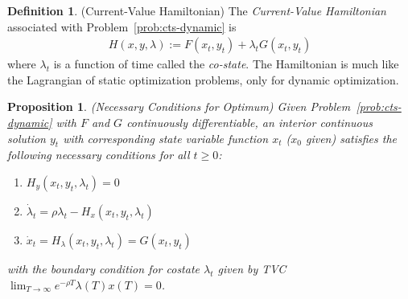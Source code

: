 \documentclass[12pt]{article}
\numberwithin{equation}{section} %
\theoremstyle{plain}
\newtheorem{prop}[thm]{Proposition}
\theoremstyle{definition}
\newtheorem{defn}[thm]{Definition}
\theoremstyle{remark}
\newcommand{\limT}{\lim_{T\rightarrow\infty}}
\begin{document}
\begin{defn}{(Current-Value Hamiltonian)}
The \emph{Current-Value Hamiltonian} associated with
Problem~\ref{prob:cts-dynamic} is
\begin{align*}
  H(x,y,\lambda) := F(x_t,y_t) + \lambda_t G(x_t,y_t)
\end{align*}
where $\lambda_t$ is a function of time called the \emph{co-state}.
The Hamiltonian is much like the Lagrangian of static optimization
problems, only for dynamic optimization.
\end{defn}

\begin{prop}\emph{(Necessary Conditions for Optimum)}
Given Problem~\ref{prob:cts-dynamic} with $F$ and $G$ continuously
differentiable, an interior continuous solution $y_t$ with corresponding
state variable function $x_t$ ($x_0$ given) satisfies the following
necessary conditions for all $t\geq 0$:
\begin{enumerate}
  \item $H_y (x_t,y_t,\lambda_t) = 0$
  \item $\dot{\lambda}_t = \rho\lambda_t- H_x(x_t, y_t, \lambda_t)$
  \item $\dot{x}_t = H_\lambda(x_t,y_t,\lambda_t) = G(x_t, y_t)$
\end{enumerate}
with the boundary condition for costate $\lambda_t$ given by TVC
$\limT e^{-\rho T} \lambda(T)x(T)=0$.
\end{prop}
\end{document}
